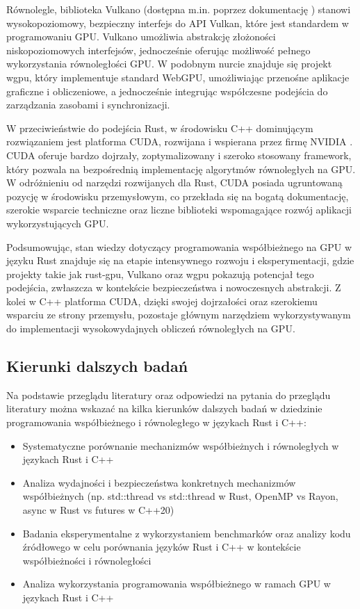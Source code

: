 Równolegle, biblioteka Vulkano (dostępna m.in. poprzez dokumentację \cite{docsVulkanoRust}) stanowi wysokopoziomowy, bezpieczny interfejs do API Vulkan, które jest standardem w programowaniu GPU. Vulkano umożliwia abstrakcję złożoności niskopoziomowych interfejsów, jednocześnie oferując możliwość pełnego wykorzystania równoległości GPU. W podobnym nurcie znajduje się projekt wgpu, który implementuje standard WebGPU, umożliwiając przenośne aplikacje graficzne i obliczeniowe, a jednocześnie integrując współczesne podejścia do zarządzania zasobami i synchronizacji.

W przeciwieństwie do podejścia Rust, w środowisku C++ dominującym rozwiązaniem jest platforma CUDA, rozwijana i wspierana przez firmę NVIDIA \cite{nvidiaCUDAToolkit}. CUDA oferuje bardzo dojrzały, zoptymalizowany i szeroko stosowany framework, który pozwala na bezpośrednią implementację algorytmów równoległych na GPU. W odróżnieniu od narzędzi rozwijanych dla Rust, CUDA posiada ugruntowaną pozycję w środowisku przemysłowym, co przekłada się na bogatą dokumentację, szerokie wsparcie techniczne oraz liczne biblioteki wspomagające rozwój aplikacji wykorzystujących GPU.

Podsumowując, stan wiedzy dotyczący programowania współbieżnego na GPU w języku Rust znajduje się na etapie intensywnego rozwoju i eksperymentacji, gdzie projekty takie jak rust‑gpu, Vulkano oraz wgpu \cite{wgpuWgpuPortable} pokazują potencjał tego podejścia, zwłaszcza w kontekście bezpieczeństwa i nowoczesnych abstrakcji. Z kolei w C++ platforma CUDA, dzięki swojej dojrzałości oraz szerokiemu wsparciu ze strony przemysłu, pozostaje głównym narzędziem wykorzystywanym do implementacji wysokowydajnych obliczeń równoległych na GPU.

\subsection{Kierunki dalszych badań}
Na podstawie przeglądu literatury oraz odpowiedzi na pytania do przeglądu literatury można wskazać na kilka kierunków dalszych badań w dziedzinie programowania współbieżnego i równoległego w językach Rust i C++:
\begin{itemize}
    \item Systematyczne porównanie mechanizmów współbieżnych i równoległych w językach Rust i C++
    \item Analiza wydajności i bezpieczeństwa konkretnych mechanizmów współbieżnych (np. std::thread vs std::thread w Rust, OpenMP vs Rayon, async w Rust vs futures w C++20)
    \item Badania eksperymentalne z wykorzystaniem benchmarków oraz analizy kodu źródłowego w celu porównania języków Rust i C++ w kontekście współbieżności i równoległości
    \item Analiza wykorzystania programowania współbieżnego w ramach GPU w językach Rust i C++
\end{itemize}
